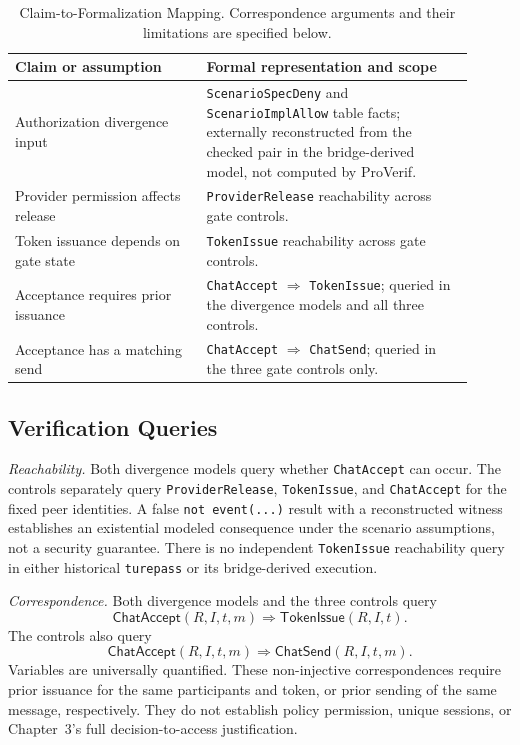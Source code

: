\begin{table}[htbp]
\centering
\small
\begin{tabular}{p{0.38\linewidth}p{0.53\linewidth}}
\hline
\raggedright Claim or assumption &
\raggedright Formal representation and scope \tabularnewline
\hline
\raggedright Authorization divergence input &
\raggedright \texttt{ScenarioSpecDeny} and \texttt{ScenarioImplAllow} table facts;
externally reconstructed from the checked pair in the bridge-derived model,
not computed by ProVerif. \tabularnewline
\raggedright Provider permission affects release &
\raggedright \texttt{ProviderRelease} reachability across gate controls. \tabularnewline
\raggedright Token issuance depends on gate state &
\raggedright \texttt{TokenIssue} reachability across gate controls. \tabularnewline
\raggedright Acceptance requires prior issuance &
\raggedright \texttt{ChatAccept} $\Rightarrow$ \texttt{TokenIssue};
queried in the divergence models and all three controls. \tabularnewline
\raggedright Acceptance has a matching send &
\raggedright \texttt{ChatAccept} $\Rightarrow$ \texttt{ChatSend};
queried in the three gate controls only. \tabularnewline
\hline
\end{tabular}
\caption{Claim-to-Formalization Mapping. Correspondence arguments and
their limitations are specified below.}
\label{tab:claim-formalization}
\end{table}

\subsection{Verification Queries}

\emph{Reachability.} Both divergence models query whether
\texttt{ChatAccept} can occur. The controls separately query
\texttt{ProviderRelease}, \texttt{TokenIssue}, and \texttt{ChatAccept} for
the fixed peer identities. A false \texttt{not event(...)} result with a
reconstructed witness establishes an existential modeled consequence under
the scenario assumptions, not a security guarantee. There is no independent
\texttt{TokenIssue} reachability query in either historical \texttt{turepass}
or its bridge-derived execution.

\emph{Correspondence.} Both divergence models and the three controls query
\[
\mathsf{ChatAccept}(R,I,t,m)\Longrightarrow\mathsf{TokenIssue}(R,I,t).
\]
The controls also query
\[
\mathsf{ChatAccept}(R,I,t,m)\Longrightarrow\mathsf{ChatSend}(R,I,t,m).
\]
Variables are universally quantified. These non-injective correspondences
require prior issuance for the same participants and token, or prior sending
of the same message, respectively. They do not establish policy permission,
unique sessions, or Chapter~3's full decision-to-access justification.

